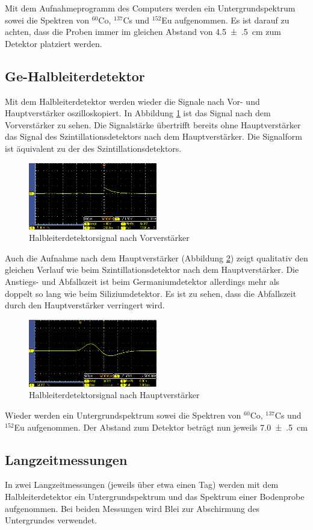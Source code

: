 Mit dem Aufnahmeprogramm des Computers werden ein Untergrundspektrum sowei die Spektren von $^{60}$Co, $^{137}$Cs und $^{152}$Eu aufgenommen. Es ist darauf zu achten, dass die Proben immer im gleichen Abstand von \SI[separate-uncertainty = true]{4.5(5)}{\centi\meter} zum Detektor platziert werden.

\subsection{Ge-Halbleiterdetektor}
Mit dem Halbleiterdetektor werden wieder die Signale nach Vor- und Hauptverstärker oszilloskopiert. In Abbildung \ref{fig:ge_nach_vorv} ist das Signal nach dem Vorverstärker zu sehen. Die Signalstärke übertrifft bereits ohne Hauptverstärker das Signal des Szintillationsdetektors nach dem Hauptverstärker.
Die Signalform ist äquivalent zu der des Szintillationsdetektors. 
\begin{figure}[h]
  \centering
  \includegraphics[width=0.5\textwidth]{data/raw/ge_nach_vorv.png}
  \caption{Halbleiterdetektorsignal nach Vorverstärker}
  \label{fig:ge_nach_vorv}
\end{figure}

Auch die Aufnahme nach dem Hauptverstärker (Abbildung \ref{fig:ge_nach_haupt}) zeigt qualitativ den gleichen Verlauf wie beim Szintillationsdetektor nach dem Hauptverstärker. Die Anstiegs- und Abfallszeit ist beim Germaniumdetektor allerdings mehr als doppelt so lang wie beim Siliziumdetektor. Es ist zu sehen, dass die Abfallszeit durch den Hauptverstärker verringert wird.
\begin{figure}[h]
  \centering
  \includegraphics[width=0.5\textwidth]{data/raw/ge_nach_haupt.png}
  \caption{Halbleiterdetektorsignal nach Hauptverstärker}
  \label{fig:ge_nach_haupt}
\end{figure}

Wieder werden ein Untergrundspektrum sowei die Spektren von $^{60}$Co, $^{137}$Cs und $^{152}$Eu aufgenommen. Der Abstand zum Detektor beträgt nun jeweils \SI[separate-uncertainty = true]{7.0(5)}{\centi\meter}

\subsection{Langzeitmessungen}
In zwei Langzeitmessungen (jeweils über etwa einen Tag) werden mit dem Halbleiterdetektor ein Untergrundspektrum und das Spektrum einer Bodenprobe aufgenommen. Bei beiden Messungen wird Blei zur Abschirmung des Untergrundes verwendet.
